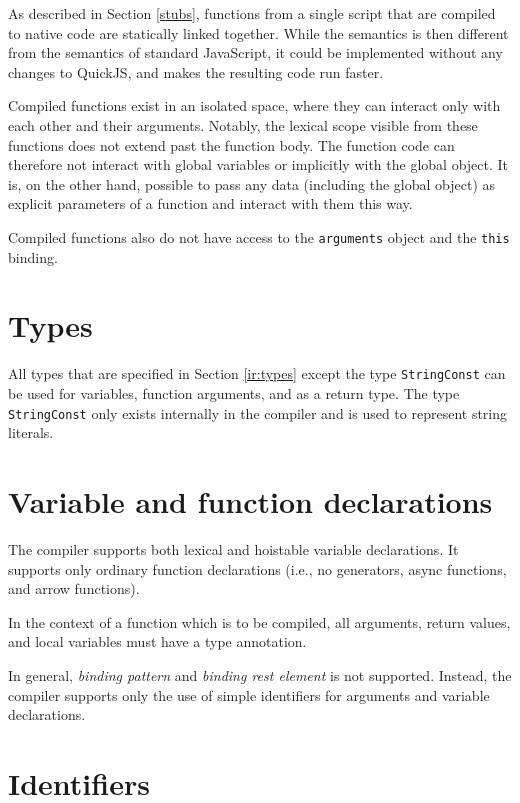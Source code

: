 As described in Section \ref{stubs}, functions from a single script that are compiled to native code are statically linked together. While the semantics is then different from the semantics of standard JavaScript, it could be implemented without any changes to QuickJS, and makes the resulting code run faster.

Compiled functions exist in an isolated space, where they can interact only with each other and their arguments. Notably, the lexical scope visible from these functions does not extend past the function body. The function code can therefore not interact with global variables or implicitly with the global object. It is, on the other hand, possible to pass any data (including the global object) as explicit parameters of a function and interact with them this way.

Compiled functions also do not have access to the \texttt{arguments} object and the \texttt{this} binding.


\section{Types}

All types that are specified in Section \ref{ir:types} except the type \texttt{StringConst} can be used for variables, function arguments, and as a return type. The type \texttt{StringConst} only exists internally in the compiler and is used to represent string literals.


\section{Variable and function declarations}

The compiler supports both lexical and hoistable variable declarations. It supports only ordinary function declarations (i.e., no generators, async functions, and arrow functions).

In the context of a function which is to be compiled, all arguments, return values, and local variables must have a type annotation.

In general, \textit{binding pattern} and \textit{binding rest element} is not supported. Instead, the compiler supports only the use of simple identifiers for arguments and variable declarations.


\section{Identifiers}

